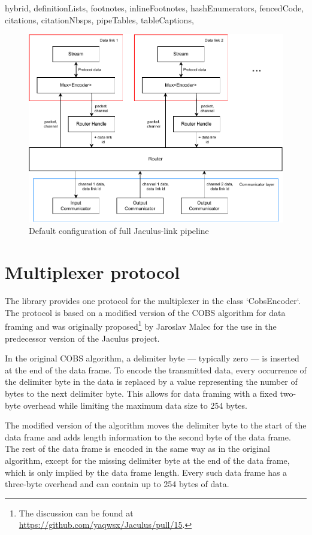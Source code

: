 \begin{markdown*}{%
  hybrid,
  definitionLists,
  footnotes,
  inlineFootnotes,
  hashEnumerators,
  fencedCode,
  citations,
  citationNbsps,
  pipeTables,
  tableCaptions,
}
\begin{figure}[!ht]
    \centering
    \includegraphics[width=\textwidth]{img/link-pipeline}
    \caption{Default configuration of full Jaculus-link pipeline}
    \label{fig:link-pipeline}
\end{figure}


\section{Multiplexer protocol} \label{sec:mux-protocol}

The library provides one protocol for the multiplexer in the class `CobsEncoder`. The protocol is based on a modified version of the COBS\cite{cobs} algorithm for data framing and was originally proposed\footnote{The discussion can be found at \url{https://github.com/yaqwsx/Jaculus/pull/15}.} by Jaroslav Malec for the use in the predecessor version of the Jaculus project.

In the original COBS algorithm, a delimiter byte --- typically zero --- is inserted at the end of the data frame. To encode the transmitted data, every occurrence of the delimiter byte in the data is replaced by a value representing the number of bytes to the next delimiter byte. This allows for data framing with a fixed two-byte overhead while limiting the maximum data size to 254 bytes.

The modified version of the algorithm moves the delimiter byte to the start of the data frame and adds length information to the second byte of the data frame. The rest of the data frame is encoded in the same way as in the original algorithm, except for the missing delimiter byte at the end of the data frame, which is only implied by the data frame length. Every such data frame has a three-byte overhead and can contain up to 254 bytes of data.


\end{markdown*}
